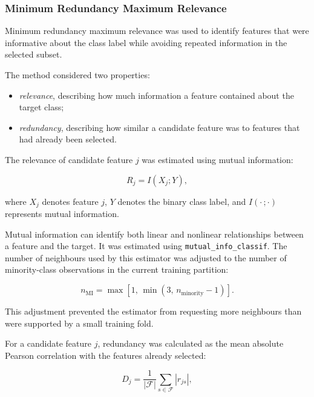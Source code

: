 \documentclass[12pt,twocolumn]{article}
\begin{document}
\subsubsection{Minimum Redundancy Maximum Relevance}
\label{subsubsec:mrmr}

Minimum redundancy maximum relevance was used to identify features
that were informative about the class label while avoiding repeated
information in the selected subset.

The method considered two properties:

\begin{itemize}
    \item \textit{relevance}, describing how much information a
    feature contained about the target class;

    \item \textit{redundancy}, describing how similar a candidate
    feature was to features that had already been selected.
\end{itemize}

The relevance of candidate feature \(j\) was estimated using mutual
information:

\begin{equation}
R_j = I(X_j;Y),
\label{eq:mrmr_relevance}
\end{equation}

where \(X_j\) denotes feature \(j\), \(Y\) denotes the binary class
label, and \(I(\cdot\,;\cdot)\) represents mutual information.

Mutual information can identify both linear and nonlinear
relationships between a feature and the target. It was estimated
using \texttt{mutual\_info\_classif}. The number of neighbours used
by this estimator was adjusted to the number of minority-class
observations in the current training partition:

\begin{equation}
n_{\mathrm{MI}}
=
\max
\left[
1,\,
\min
\left(
3,\,
n_{\mathrm{minority}}-1
\right)
\right].
\label{eq:mi_neighbours}
\end{equation}

This adjustment prevented the estimator from requesting more
neighbours than were supported by a small training fold.

For a candidate feature \(j\), redundancy was calculated as the mean
absolute Pearson correlation with the features already selected:

\begin{equation}
D_j
=
\frac{1}{|\mathcal{F}|}
\sum_{s\in\mathcal{F}}
\left|r_{js}\right|,
\label{eq:mrmr_redundancy}
\end{equation}
\end{document}
